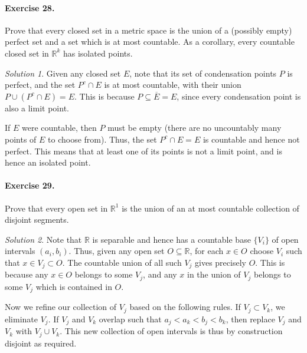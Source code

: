 \documentclass[11pt]{report}
\def\R{\mathbb{R}}
\theoremstyle{remark}
\newtheorem*{solution}{Solution}
\begin{document}
    \paragraph{Exercise 28.} Prove that every closed set in a metric space is the
    union of a (possibly empty) perfect set and a set which is at most countable.
    As a corollary, every countable closed set in $\R^k$ has isolated points.
    \begin{solution}
        Given any closed set $E$, note that its set of condensation points $P$ is
        perfect, and the set $P^c \cap E$ is at most countable, with their union $P
        \cup (P^c \cap E) = E$. This is because $P \subseteq \overline{E} = E$, since
        every condensation point is also a limit point.

        If $E$ were countable, then $P$ must be empty (there are no uncountably many
        points of $E$ to choose from). Thus, the set $P^c \cap E = E$ is countable
        and hence not perfect. This means that at least one of its points is not a
        limit point, and is hence an isolated point.
    \end{solution}
    
    \paragraph{Exercise 29.} Prove that every open set in $\R^1$ is the union of an
    at most countable collection of disjoint segments.
    \begin{solution}
        Note that $\R$ is separable and hence has a countable base $\{V_i\}$ of open
        intervals $(a_i, b_i)$. Thus, given any open set $O \subseteq \R$, for each
        $x \in O$ choose $V_i$ such that $x \in V_j \subset O$. The countable union
        of all such $V_j$ gives precisely $O$. This is because any $x \in O$ belongs
        to some $V_j$, and any $x$ in the union of $V_j$ belongs to some $V_j$ which
        is contained in $O$.

        Now we refine our collection of $V_j$ based on the following rules. If $V_j
        \subset V_k$, we eliminate $V_j$. If $V_j$ and $V_k$ overlap such that $a_j
        < a_k < b_j < b_k$, then replace $V_j$ and $V_k$ with $V_j \cup V_k$. This
        new collection of open intervals is thus by construction disjoint as
        required.
    \end{solution}
\end{document}
